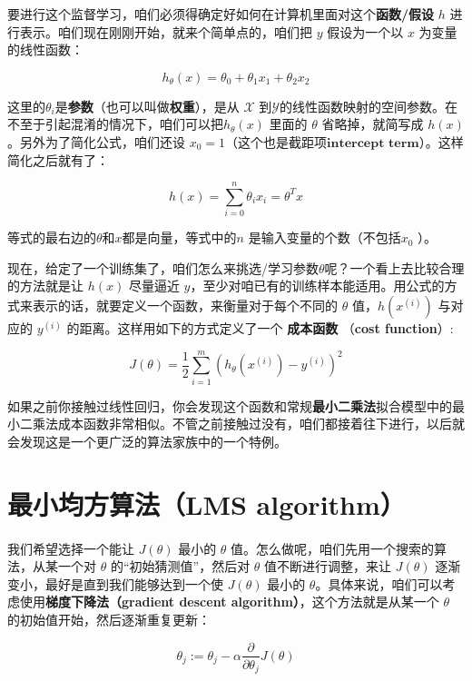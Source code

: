 \documentclass[UTF8]{ctexart}
\begin{document}
		要进行这个监督学习，咱们必须得确定好如何在计算机里面对这个\textbf{函数/假设} $h$ 进行表示。咱们现在刚刚开始，就来个简单点的，咱们把 $y$ 假设为一个以 $x$ 为变量的线性函数：
		
		\[ h_{\theta}(x) = \theta_{0} + \theta_{1}x_{1} + \theta_{2}x_{2} \]
		
		这里的$ \theta_{i} $是\textbf{参数}（也可以叫做\textbf{权重}），是从 $\mathcal{X}$ 到$ \mathcal{Y} $的线性函数映射的空间参数。在不至于引起混淆的情况下，咱们可以把$h_{\theta}(x)$ 里面的 $\theta$ 省略掉，就简写成 $h(x)$。另外为了简化公式，咱们还设 $x_{0} = 1$（这个也是$\textbf{截距项intercept term}$）。这样简化之后就有了：
		
		\[ h(x) = \sum_{i=0}^{n} \theta_{i}x_{i} = \theta^{T}x \]
		
		等式的最右边的$ \theta $和$ x $都是向量，等式中的$ n $ 是输入变量的个数（不包括$x_{0}$ ）。
		
		现在，给定了一个训练集了，咱们怎么来挑选/学习参数$\theta$呢？一个看上去比较合理的方法就是让 $h(x)$ 尽量逼近 $y$，至少对咱已有的训练样本能适用。用公式的方式来表示的话，就要定义一个函数，来衡量对于每个不同的 $\theta$ 值，$h(x^{(i)})$ 与对应的 $y^{(i)}$ 的距离。这样用如下的方式定义了一个 \textbf{成本函数} （\textbf{cost function}）: 
		
		\[ J(\theta) = \frac{1}{2} \sum_{i=1}^{m}(h_{\theta}(x^{(i)}) - y^{(i)})^2 \]
		
		如果之前你接触过线性回归，你会发现这个函数和常规\textbf{最小二乘法}拟合模型中的最小二乘法成本函数非常相似。不管之前接触过没有，咱们都接着往下进行，以后就会发现这是一个更广泛的算法家族中的一个特例。
		
		\section{最小均方算法（LMS algorithm）}
		
		\paragraph{}
		我们希望选择一个能让 $J(\theta)$ 最小的 $\theta$ 值。怎么做呢，咱们先用一个搜索的算法，从某一个对 $\theta$ 的“初始猜测值”，然后对 $\theta$ 值不断进行调整，来让 $J(\theta)$ 逐渐变小，最好是直到我们能够达到一个使 $J(\theta)$ 最小的 $\theta$。具体来说，咱们可以考虑使用\textbf{梯度下降法（gradient descent algorithm）}，这个方法就是从某一个 $\theta$ 的初始值开始，然后逐渐重复更新：
		
		\[ \theta_{j} := \theta_{j} - \alpha\frac{\partial}{\partial\theta_{j}}J(\theta) \]
		
\end{document}
